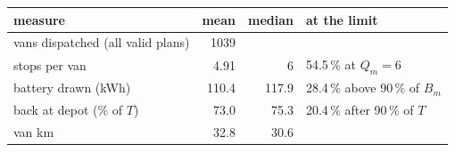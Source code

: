 \begin{tabular}{@{}lrrl@{}}
\toprule
measure & mean & median & at the limit \\
\midrule
vans dispatched (all valid plans) & 1039 &  &  \\
stops per van & 4.91 & 6 & 54.5\,\% at $Q_m=6$ \\
battery drawn (kWh) & 110.4 & 117.9 & 28.4\,\% above 90\,\% of $B_m$ \\
back at depot ($\%$ of $T$) & 73.0 & 75.3 & 20.4\,\% after 90\,\% of $T$ \\
van km & 32.8 & 30.6 &  \\
\bottomrule
\end{tabular}
